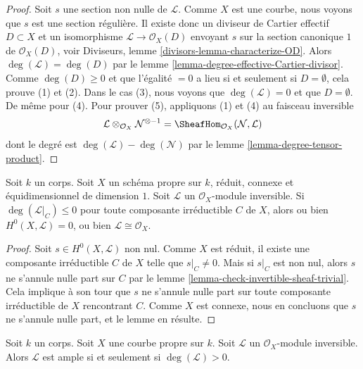 \begin{proof}
Soit $s$ une section non nulle de $\mathcal{L}$. Comme $X$ est une courbe, nous
voyons que $s$ est une section régulière. Il existe donc un diviseur de
Cartier effectif $D \subset X$ et un isomorphisme
$\mathcal{L} \to \mathcal{O}_X(D)$ envoyant $s$ sur la section canonique
$1$ de $\mathcal{O}_X(D)$, voir
Diviseurs, lemme \ref{divisors-lemma-characterize-OD}.
Alors $\deg(\mathcal{L}) = \deg(D)$ par
le lemme \ref{lemma-degree-effective-Cartier-divisor}.
Comme $\deg(D) \geq 0$ et que l'égalité $= 0$ a lieu
si et seulement si $D = \emptyset$, cela prouve (1) et (2).
Dans le cas (3), nous voyons que $\deg(\mathcal{L}) = 0$ et que
$D = \emptyset$. De même pour (4). Pour prouver (5), appliquons
(1) et (4) au faisceau inversible
$$
\mathcal{L} \otimes_{\mathcal{O}_X} \mathcal{N}^{\otimes -1} =
\SheafHom_{\mathcal{O}_X}(\mathcal{N}, \mathcal{L})
$$
dont le degré est $\deg(\mathcal{L}) - \deg(\mathcal{N})$
par le lemme \ref{lemma-degree-tensor-product}.
\end{proof}

\begin{lemma}
\label{lemma-no-sections-dual-nef}
Soit $k$ un corps. Soit $X$ un schéma propre sur $k$,
réduit, connexe et équidimensionnel de dimension $1$.
Soit $\mathcal{L}$ un $\mathcal{O}_X$-module inversible.
Si $\deg(\mathcal{L}|_C) \leq 0$ pour toute composante irréductible $C$
de $X$, alors ou bien $H^0(X, \mathcal{L}) = 0$, ou bien
$\mathcal{L} \cong \mathcal{O}_X$.
\end{lemma}

\begin{proof}
Soit $s \in H^0(X, \mathcal{L})$ non nul. Comme $X$ est réduit, il existe
une composante irréductible $C$ de $X$ telle que $s|_C \not = 0$.
Mais si $s|_C$ est non nul, alors
$s$ ne s'annule nulle part sur $C$ par
le lemme \ref{lemma-check-invertible-sheaf-trivial}.
Cela implique à son tour que $s$ ne s'annule nulle part sur
toute composante irréductible de $X$ rencontrant $C$.
Comme $X$ est connexe, nous en concluons que $s$
ne s'annule nulle part, et le lemme en résulte.
\end{proof}

\begin{lemma}
\label{lemma-ample-curve}
Soit $k$ un corps. Soit $X$ une courbe propre sur $k$.
Soit $\mathcal{L}$ un $\mathcal{O}_X$-module inversible.
Alors $\mathcal{L}$ est ample si et seulement si $\deg(\mathcal{L}) > 0$.
\end{lemma}

